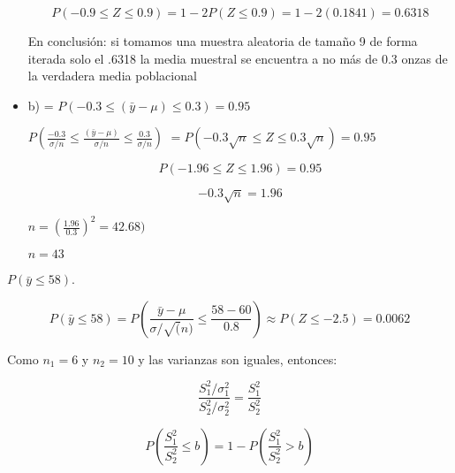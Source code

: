 \documentclass{../oxmathproblems}
\begin{document}
\begin{questions}
\begin{itemize}
$$P(-0.9 \leq Z \leq 0.9)  = 1- 2P(Z \leq 0.9) = 1- 2(0.1841) = 0.6318
$$

En conclusión: si tomamos una muestra aleatoria de tamaño 9 de forma
iterada solo el .6318 la media muestral se encuentra a no más de 0.3 onzas de la verdadera media poblacional

\item b)
=  $ P(-0.3 \leq (\bar{y}-\mu) \leq 0.3) = 0.95  $ 


$ P(\frac{-0.3}{\sigma/n} \leq \frac{(\bar{y}-\mu)}{\sigma/n} \leq \frac{0.3}{\sigma/n}) 
$ 
$ 
= P( -0.3\sqrt{n} \leq Z \leq 0.3\sqrt{n} ) = 0.95 
$


$$P( -1.96 \leq Z \leq 1.96 ) = 0.95 
$$ 


$$  -0.3\sqrt{n} = 1.96$$

$
n = (\frac{1.96}{0.3})^2 = 42.68) 
$

$ n  = 43 $ 

\end{itemize}


\miquestion 
{}


 $ P( \bar{y} \leq 58) $. 
 
$$
 P( \bar{y} \leq 58) =  P(\frac{\bar{y}-\mu}{\sigma/\sqrt(n)} \leq \frac{58-60}{0.8}) \approx P(Z \leq -2.5) = 0.0062 
$$
 


\miquestion Como $n_1 = 6 $ y $n_2 = 10$ y las varianzas son iguales, entonces: 

$$\frac{S_1^2/\sigma_1^2 }{S_2^2/\sigma_2^2 }  = \frac{S_1^2}{S_2^2}  $$  


$$ P(\frac{S_1^2}{S_2^2} \leq b) =  1- P(\frac{S_1^2}{S_2^2} > b)  $$ 


\end{questions}
\end{document}
